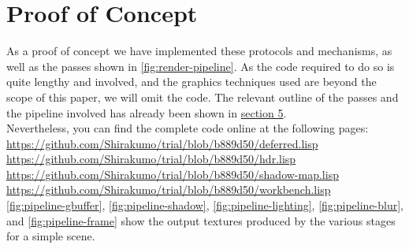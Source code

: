 \documentclass[format=sigconf]{acmart}
\begin{document}
\section{Proof of Concept}\label{concept}
As a proof of concept we have implemented these protocols and mechanisms, as well as the passes shown in \autoref{fig:render-pipeline}. As the code required to do so is quite lengthy and involved, and the graphics techniques used are beyond the scope of this paper, we will omit the code. The relevant outline of the passes and the pipeline involved has already been shown in \hyperref[pipelines]{section 5}. \\

Nevertheless, you can find the complete code online at the following pages: \\
\url{https://github.com/Shirakumo/trial/blob/b889d50/deferred.lisp} \\
\url{https://github.com/Shirakumo/trial/blob/b889d50/hdr.lisp} \\
\url{https://github.com/Shirakumo/trial/blob/b889d50/shadow-map.lisp} \\
\url{https://github.com/Shirakumo/trial/blob/b889d50/workbench.lisp} \\

\autoref{fig:pipeline-gbuffer}, \autoref{fig:pipeline-shadow}, \autoref{fig:pipeline-lighting}, \autoref{fig:pipeline-blur}, and \autoref{fig:pipeline-frame} show the output textures produced by the various stages for a simple scene.
\end{document}
